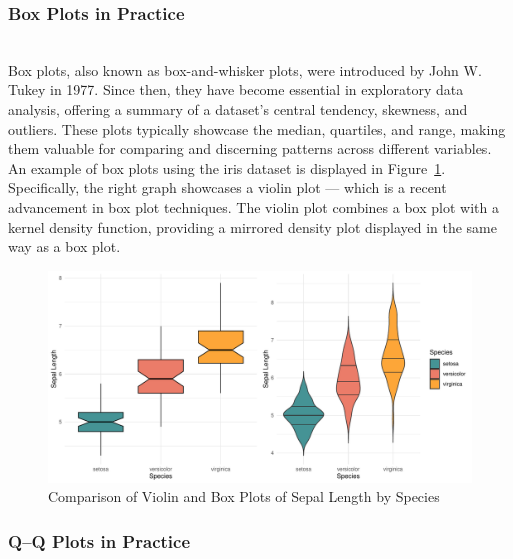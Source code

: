\documentclass{article}\usepackage[]{graphicx}\usepackage[]{xcolor}
\makeatletter
\def\maxwidth{ %
  \ifdim\Gin@nat@width>\linewidth
    \linewidth
  \else
    \Gin@nat@width
  \fi
}
\newenvironment{knitrout}{}{} %
\numberwithin{equation}{section}
\makeatother
\begin{document}
\subsubsection{Box Plots in Practice}\\

\noindent 
Box plots, also known as box-and-whisker plots, were introduced by John W. Tukey in 1977. Since then, they have become essential in exploratory data analysis, offering a summary of a dataset's central tendency, skewness, and outliers. These plots typically showcase the median, quartiles, and range, making them valuable for comparing and discerning patterns across different variables.\\

\noindent
An example of box plots using the iris dataset is displayed in Figure~\ref{fig:box-plots}. Specifically, the right graph showcases a violin plot — which is a recent advancement in box plot techniques. The violin plot combines a box plot with a kernel density function, providing a mirrored density plot displayed in the same way as a box plot.\\
\begin{knitrout}\scriptsize
{}\color{fgcolor}\begin{figure}[h]

{\centering \includegraphics[width=\maxwidth]{figure/beamer-box-plots-1} 

}

\caption[Comparison of Violin and Box Plots of Sepal Length by Species]{Comparison of Violin and Box Plots of Sepal Length by Species}\label{fig:box-plots}
\end{figure}

\end{knitrout}

\subsubsection{Q–Q Plots in Practice}\\
\end{document}
